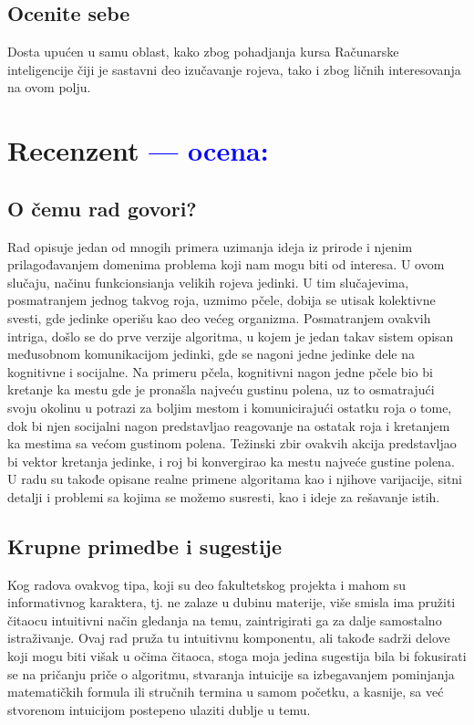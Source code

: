 \documentclass[a4paper]{report}
\newcommand{\odgovor}[1]{\textcolor{blue}{#1}}
\begin{document}
\section{Ocenite sebe}
{Dosta upućen u samu oblast, kako zbog pohadjanja kursa Računarske inteligencije čiji je sastavni deo izučavanje rojeva, tako i zbog ličnih interesovanja na ovom polju.}


\chapter{Recenzent \odgovor{--- ocena:} }


\section{O čemu rad govori?}
Rad opisuje jedan od mnogih primera uzimanja ideja iz prirode i njenim prilagođavanjem domenima problema koji nam mogu biti od interesa. U ovom slučaju, 
načinu funkcionsianja velikih rojeva jedinki. U tim slučajevima, posmatranjem jednog takvog roja, uzmimo pčele, dobija se utisak kolektivne svesti, 
gde jedinke operišu kao deo većeg organizma. Posmatranjem ovakvih intriga, došlo se do prve verzije algoritma, u kojem je jedan takav sistem opisan 
međusobnom komunikacijom jedinki, gde se nagoni jedne jedinke dele na kognitivne i socijalne. Na primeru pčela, kognitivni nagon jedne pčele bio bi  
kretanje ka mestu gde je pronašla najveću gustinu polena, uz to osmatrajući svoju okolinu u potrazi za boljim mestom i komunicirajući ostatku roja o tome, 
dok bi njen socijalni nagon predstavljao reagovanje na ostatak roja i kretanjem ka mestima sa većom gustinom polena. Težinski zbir ovakvih akcija 
predstavljao bi vektor kretanja jedinke, i roj bi konvergirao ka mestu najveće gustine polena. U radu su takođe opisane realne primene algoritama 
kao i njihove varijacije, sitni detalji i problemi sa kojima se možemo susresti, kao i ideje za rešavanje istih. 

\section{Krupne primedbe i sugestije}
Kog radova ovakvog tipa, koji su deo fakultetskog projekta i mahom su informativnog karaktera, tj. ne zalaze u dubinu materije, više smisla ima 
pružiti čitaocu intuitivni način gledanja na temu, zaintrigirati ga za dalje samostalno istraživanje. Ovaj rad pruža tu intuitivnu komponentu, ali 
takođe sadrži delove koji mogu biti višak u očima čitaoca, stoga moja jedina sugestija bila bi fokusirati se na pričanju priče o algoritmu, 
stvaranja intuicije sa izbegavanjem pominjanja matematičkih formula ili stručnih termina u samom početku, a kasnije, sa već stvorenom intuicijom postepeno 
ulaziti dublje u temu.
\end{document}
